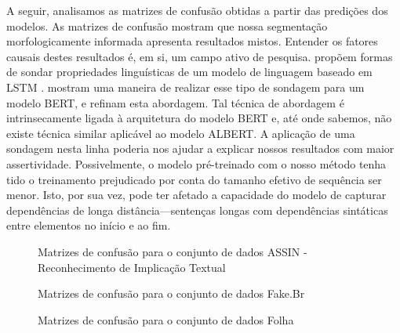 \documentclass[cic,tc]{iiufrgs}
\begin{document}
A seguir, analisamos as matrizes de confusão obtidas a partir das predições dos modelos. As matrizes de confusão mostram que nossa segmentação morfologicamente informada apresenta resultados mistos. Entender os fatores causais destes resultados é, em si, um campo ativo de pesquisa. \citet{conneau-etal-2018-cram} propõem formas de sondar propriedades linguísticas de um modelo de linguagem baseado em LSTM \cite{Sundermeyer2012LSTMNN}. \citet{Hewitt2019ASP} mostram uma maneira de realizar esse tipo de sondagem para um modelo BERT, e \citet{chen2021probing} refinam esta abordagem. Tal técnica de abordagem é intrinsecamente ligada à arquitetura do modelo BERT e, até onde sabemos, não existe técnica similar aplicável ao modelo ALBERT. A aplicação de uma sondagem nesta linha poderia nos ajudar a explicar nossos resultados com maior assertividade. Possivelmente, o modelo pré-treinado com o nosso método tenha tido o treinamento prejudicado por conta do tamanho efetivo de sequência ser menor. Isto, por sua vez, pode ter afetado a capacidade do modelo de capturar dependências de longa distância---sentenças longas com dependências sintáticas entre elementos no início e ao fim.

\begin{figure}
    \centering
    \caption{Matrizes de confusão para o conjunto de dados ASSIN - Reconhecimento de Implicação Textual}
    \label{fig:assin_cm}
\end{figure}

\begin{figure}
    \centering
    \caption{Matrizes de confusão para o conjunto de dados Fake.Br}
    \label{fig:fakebr_cm}
\end{figure}

\begin{figure}
    \centering
    \caption{Matrizes de confusão para o conjunto de dados Folha}
    \label{fig:folha_cm}
\end{figure}
\end{document}
